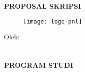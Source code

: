 \pagestyle{empty}
\begin{center}

\large
\MakeUppercase{\textbf{proposal skripsi}}

\vfill
\begin{figure}[h]
\centering
\texttt{[image: logo-pnl]}
\end{figure}

\vfill
\normalsize
\MakeUppercase{\textbf{\judulId}}

\vfill
Oleh: \\
\MakeUppercase{\mahasiswa} \\
\nim \\

\vfill
\MakeUppercase{
\textbf{
program studi \prodi \\
\jurusan \\
\institusi \\
\the\year{}
}}

\end{center}
